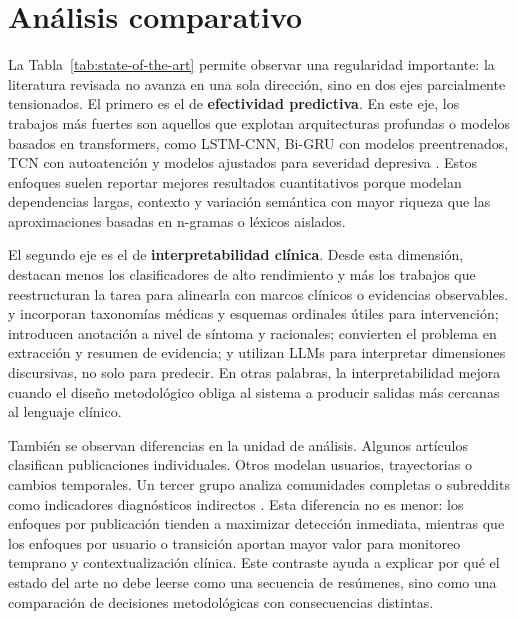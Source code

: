 \section{Análisis comparativo}

La Tabla~\ref{tab:state-of-the-art} permite observar una regularidad importante: la literatura revisada no avanza en una sola dirección, sino en dos ejes parcialmente tensionados. El primero es el de \textbf{efectividad predictiva}. En este eje, los trabajos más fuertes son aquellos que explotan arquitecturas profundas o modelos basados en transformers, como LSTM-CNN, Bi-GRU con modelos preentrenados, TCN con autoatención y modelos ajustados para severidad depresiva \citep{tadesse2020suicide, mirtaheri2024tcn, shuvo2024bigru, qasim2025depression}. Estos enfoques suelen reportar mejores resultados cuantitativos porque modelan dependencias largas, contexto y variación semántica con mayor riqueza que las aproximaciones basadas en n-gramas o léxicos aislados.

El segundo eje es el de \textbf{interpretabilidad clínica}. Desde esta dimensión, destacan menos los clasificadores de alto rendimiento y más los trabajos que reestructuran la tarea para alinearla con marcos clínicos o evidencias observables. \citet{gaur2018dsm5} y \citet{gaur2019severity} incorporan taxonomías médicas y esquemas ordinales útiles para intervención; \citet{bao2025redsm5} introducen anotación a nivel de síntoma y racionales; \citet{singh2024evidence} convierten el problema en extracción y resumen de evidencia; y \citet{bauer2024llm} utilizan LLMs para interpretar dimensiones discursivas, no solo para predecir. En otras palabras, la interpretabilidad mejora cuando el diseño metodológico obliga al sistema a producir salidas más cercanas al lenguaje clínico.

También se observan diferencias en la unidad de análisis. Algunos artículos clasifican publicaciones individuales. Otros modelan usuarios, trayectorias o cambios temporales. Un tercer grupo analiza comunidades completas o subreddits como indicadores diagnósticos indirectos \citep{tadesse2020suicide, chatterjee2022multimodal, mirtaheri2024tcn, dechoudhury2016shifts, gaur2019severity, gaur2018dsm5, bauer2024llm}. Esta diferencia no es menor: los enfoques por publicación tienden a maximizar detección inmediata, mientras que los enfoques por usuario o transición aportan mayor valor para monitoreo temprano y contextualización clínica. Este contraste ayuda a explicar por qué el estado del arte no debe leerse como una secuencia de resúmenes, sino como una comparación de decisiones metodológicas con consecuencias distintas.

